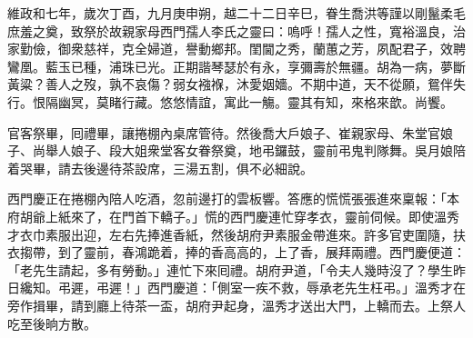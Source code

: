 \begin{myquote}[\markfont]
維政和七年，歲次丁酉，九月庚申朔，越二十二日辛巳，眷生喬洪等謹以剛鬣柔毛庶羞之奠，致祭於故親家母西門孺人李氏之靈曰：嗚呼！孺人之性，寬裕溫良，治家勤儉，御衆慈祥，克全婦道，譽動鄉邦。閨閫之秀，蘭蕙之芳，夙配君子，效聘鸞凰。藍玉已種，浦珠已光。正期諧琴瑟於有永，享彌壽於無疆。胡為一病，夢斷黃粱？善人之歿，孰不哀傷？弱女襁褓，沐愛姻嬙。不期中道，天不從願，鴛伴失行。恨隔幽冥，莫睹行藏。悠悠情誼，寓此一觴。靈其有知，來格來歆。尚饗。
\end{myquote} 

官客祭畢，囘禮畢，讓捲棚內桌席管待。然後喬大戶娘子、崔親家母、朱堂官娘子、尚舉人娘子、段大姐衆堂客女眷祭奠，地弔鑼鼓，靈前弔鬼判隊舞。吳月娘陪着哭畢，請去後邊待茶設席，三湯五割，俱不必細說。

西門慶正在捲棚內陪人吃酒，忽前邊打的雲板響。答應的慌慌張張進來稟報：「本府胡爺上紙來了，在門首下轎子。」慌的西門慶連忙穿孝衣，靈前伺候。即使溫秀才衣巾素服出迎，左右先捧進香紙，然後胡府尹素服金帶進來。許多官吏圍隨，扶衣搊帶，到了靈前，春鴻跪着，捧的香高高的，上了香，展拜兩禮。西門慶便道：「老先生請起，多有勞動。」連忙下來囘禮。胡府尹道，「令夫人幾時沒了？學生昨日纔知。弔遲，弔遲！」西門慶道：「側室一疾不救，辱承老先生枉弔。」溫秀才在旁作揖畢，請到廳上待茶一盃，胡府尹起身，溫秀才送出大門，上轎而去。上祭人吃至後晌方散。

